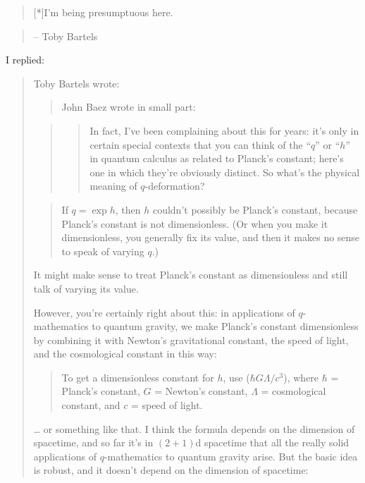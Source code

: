 \documentclass{article}
\begin{document}
\begin{quote}
{[}*{]}I'm being presumptuous here.
\end{quote}

\begin{quote}
-- Toby Bartels
\end{quote}

I replied:

\begin{quote}
Toby Bartels wrote:

\begin{quote}
John Baez wrote in small part:
\end{quote}

\begin{quote}
\begin{quote}
In fact, I've been complaining about this for years: it's only in
certain special contexts that you can think of the ``\(q\)'' or
``\(h\)'' in quantum calculus as related to Planck's constant; here's
one in which they're obviously distinct. So what's the physical meaning
of \(q\)-deformation?
\end{quote}
\end{quote}

\begin{quote}
If \(q = \exp h\), then \(h\) couldn't possibly be Planck's constant,
because Planck's constant is not dimensionless. (Or when you make it
dimensionless, you generally fix its value, and then it makes no sense
to speak of varying \(q\).)
\end{quote}

It might make sense to treat Planck's constant as dimensionless and
still talk of varying its value.

However, you're certainly right about this: in applications of
\(q\)-mathematics to quantum gravity, we make Planck's constant
dimensionless by combining it with Newton's gravitational constant, the
speed of light, and the cosmological constant in this way:

\begin{quote}
To get a dimensionless constant for \(h\), use
(\(\hbar G \Lambda/c^3\)), where \(\hbar\) = Planck's constant, \(G\) =
Newton's constant, \(\Lambda\) = cosmological constant, and \(c\) =
speed of light.
\end{quote}

\ldots{} or something like that. I think the formula depends on the
dimension of spacetime, and so far it's in \((2+1)\)d spacetime that all
the really solid applications of \(q\)-mathematics to quantum gravity
arise. But the basic idea is robust, and it doesn't depend on the
dimension of spacetime:


\end{quote}
\end{document}
